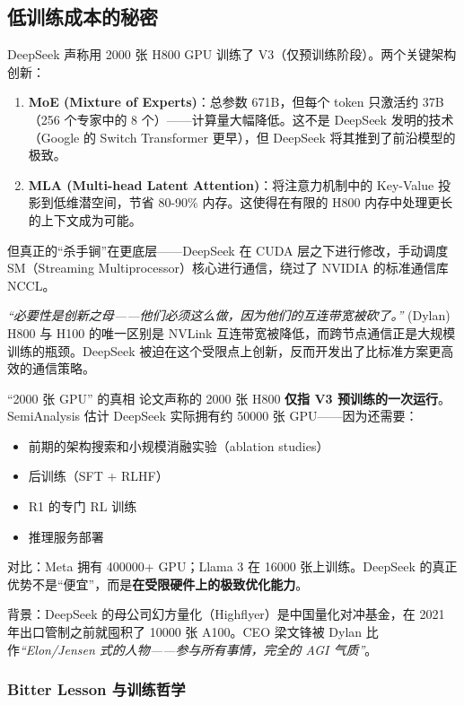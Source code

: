 \documentclass[a4paper]{article}
\begin{document}
\subsection{低训练成本的秘密}

DeepSeek 声称用 2000 张 H800 GPU 训练了 V3（仅预训练阶段）。两个关键架构创新：

\begin{enumerate}
    \item \textbf{MoE (Mixture of Experts)}：总参数 671B，但每个 token 只激活约 37B（256 个专家中的 8 个）——计算量大幅降低。这不是 DeepSeek 发明的技术（Google 的 Switch Transformer 更早），但 DeepSeek 将其推到了前沿模型的极致。
    \item \textbf{MLA (Multi-head Latent Attention)}：将注意力机制中的 Key-Value 投影到低维潜空间，节省 80-90\% 内存。这使得在有限的 H800 内存中处理更长的上下文成为可能。
\end{enumerate}

但真正的``杀手锏''在更底层——DeepSeek 在 CUDA 层之下进行修改，手动调度 SM（Streaming Multiprocessor）核心进行通信，绕过了 NVIDIA 的标准通信库 NCCL。

\textit{``必要性是创新之母——他们必须这么做，因为他们的互连带宽被砍了。''} (Dylan) H800 与 H100 的唯一区别是 NVLink 互连带宽被降低，而跨节点通信正是大规模训练的瓶颈。DeepSeek 被迫在这个受限点上创新，反而开发出了比标准方案更高效的通信策略。

\begin{warningbox}{``2000 张 GPU'' 的真相}
论文声称的 2000 张 H800 \textbf{仅指 V3 预训练的一次运行}。SemiAnalysis 估计 DeepSeek 实际拥有约 50000 张 GPU——因为还需要：
\begin{itemize}
    \item 前期的架构搜索和小规模消融实验（ablation studies）
    \item 后训练（SFT + RLHF）
    \item R1 的专门 RL 训练
    \item 推理服务部署
\end{itemize}

对比：Meta 拥有 400000+ GPU；Llama 3 在 16000 张上训练。DeepSeek 的真正优势不是``便宜''，而是\textbf{在受限硬件上的极致优化能力}。

背景：DeepSeek 的母公司幻方量化（Highflyer）是中国量化对冲基金，在 2021 年出口管制之前就囤积了 10000 张 A100。CEO 梁文锋被 Dylan 比作\textit{``Elon/Jensen 式的人物——参与所有事情，完全的 AGI 气质''}。
\end{warningbox}

\subsubsection{Bitter Lesson 与训练哲学}
\end{document}
